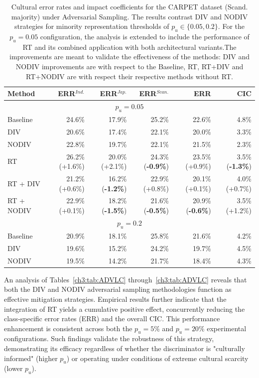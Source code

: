 \begin{table}
\centering
\small
\begin{tabular}{lrrrrr}
\toprule
\textbf{Method} & \textbf{ERR$^{Ind.}$} & \textbf{ERR$^{Jap.}$} & \textbf{ERR$^{Scan.}$} & \textbf{ERR} & \textbf{CIC} \\
\midrule
\multicolumn{6}{c}{$p_u=0.05$} \\
\midrule
Baseline & 24.6\%&	17.9\%&	25.2\%&	22.6\%&	4.8\%\\	
DIV & 20.6\%&	17.4\%&	22.1\%&	20.0\%&	3.3\%\\
NODIV & 22.8\%&	19.7\%&	22.1\%&	21.5\%&	2.3\%\\
\midrule
RT              & 26.2\% (+1.6\%) & 20.0\% (+2.1\%) & 24.3\% (\textbf{-0.9\%}) & 23.5\% (+0.9\%) & 3.5\% (\textbf{-1.3\%}) \\
RT + DIV        & 21.2\% (+0.6\%) & 16.2\% (\textbf{-1.2\%}) & 22.9\% (+0.8\%) & 20.1\% (+0.1\%) & 4.0\% (+0.7\%) \\
RT + NODIV      & 22.9\% (+0.1\%) & 18.2\% (\textbf{-1.5\%}) & 21.6\% (\textbf{-0.5\%}) & 20.9\% (\textbf{-0.6\%}) & 3.5\% (+1.2\%) \\
\midrule
\multicolumn{6}{c}{$p_u=0.2$} \\
\midrule
Baseline & 20.9\% & 18.1\% & 25.8\% & 21.6\% & 4.2\% \\
DIV & 19.6\% & 15.2\% & 24.2\% & 19.7\% & 4.5\% \\
NODIV & 19.5\% & 14.2\% & 21.7\% & 18.4\% & 4.3\% \\
\bottomrule
\end{tabular}
\caption{Cultural error rates and impact coefficients for the CARPET dataset (Scand. majority) under Adversarial Sampling. The results contrast DIV and NODIV strategies for minority representation thresholds of $p_u \in \{0.05, 0.2\}$. For the $p_u = 0.05$ configuration, the analysis is extended to include the performance of RT and its combined application with both architectural variants.The improvements are meant to validate the effectiveness of the methods: DIV and NODIV improvements are with respect to the Baseline, RT, RT+DIV and RT+NODIV are with respect their respective methods without RT.}
\label{ch3:tab:ADVCS}
\end{table}
%

An analysis of Tables~\ref{ch3:tab:ADVLC} through~\ref{ch3:tab:ADVLC} reveals that both the DIV and NODIV adversarial sampling methodologies function as effective mitigation strategies. 
Empirical results further indicate that the integration of RT yields a cumulative positive effect, concurrently reducing the class-specific error rates (ERR) and the overall CIC.
This performance enhancement is consistent across both the $p_u = 5\%$ and $p_u = 20\%$ experimental configurations. 
Such findings validate the robustness of this strategy, demonstrating its efficacy regardless of whether the discriminator is "culturally informed" (higher $p_u$) or operating under conditions of extreme cultural scarcity (lower $p_u$).

